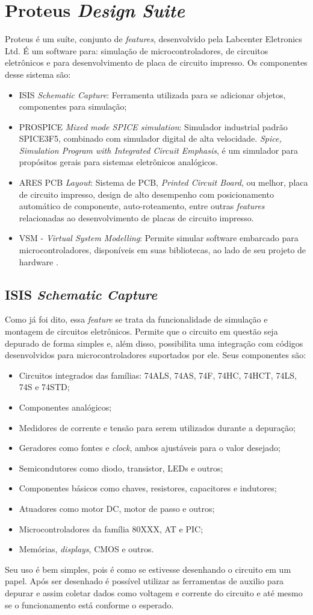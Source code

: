 \section{Proteus \emph{Design Suite}}
Proteus é um suíte, conjunto de \emph{features}, desenvolvido pela Labcenter Eletronics Ltd. É um software para: simulação de microcontroladores, de circuitos eletrônicos e para desenvolvimento de placa de circuito impresso. Os componentes desse sistema são:
\begin{itemize}
\item ISIS \emph{Schematic Capture}: Ferramenta utilizada para se adicionar objetos, componentes para simulação;
\item PROSPICE \emph{Mixed mode SPICE simulation}: Simulador industrial padrão SPICE3F5, combinado com simulador digital de alta velocidade. \emph{Spice, Simulation Program with Integrated Circuit Emphasis}, é um simulador para propósitos gerais para sistemas eletrônicos analógicos.
\item ARES PCB \emph{Layout}: Sistema de PCB, \emph{Printed Circuit Board}, ou melhor, placa de circuito impresso, design de alto desempenho com posicionamento automático de componente, auto-roteamento, entre outras \emph{features} relacionadas ao desenvolvimento de placas de circuito impresso.
\item VSM - \emph{Virtual System Modelling}: Permite simular software embarcado para microcontroladores, disponíveis em suas bibliotecas, ao lado de seu projeto de hardware \cite{proteus2013, wikipedia2012spice}.
\end{itemize}

\subsection{ISIS \emph{Schematic Capture}}
Como já foi dito, essa \emph{feature} se trata da funcionalidade de simulação e montagem de circuitos eletrônicos. Permite que o circuito em questão seja depurado de forma simples e, além disso, possibilita uma integração com códigos desenvolvidos para microcontroladores suportados por ele. Seus componentes são:

\begin{itemize}
\item Circuitos integrados das famílias: 74ALS, 74AS, 74F, 74HC, 74HCT, 74LS, 74S e 74STD;
\item Componentes analógicos;
\item Medidores de corrente e tensão para serem utilizados durante a depuração;
\item Geradores como fontes e \emph{clock}, ambos ajustáveis para o valor desejado;
\item Semicondutores como diodo, transistor, LEDs e outros;
\item Componentes básicos como chaves, resistores, capacitores e indutores;
\item Atuadores como motor DC, motor de passo e outros;
\item Microcontroladores da família 80XXX, AT e PIC;
\item Memórias, \emph{displays}, CMOS e outros.
\end{itemize}

Seu uso é bem simples, pois é como se estivesse desenhando o circuito em um papel. Após ser desenhado é possível utilizar as ferramentas de auxilio para depurar e assim coletar dados como voltagem e corrente do circuito e até mesmo se o funcionamento está conforme o esperado.